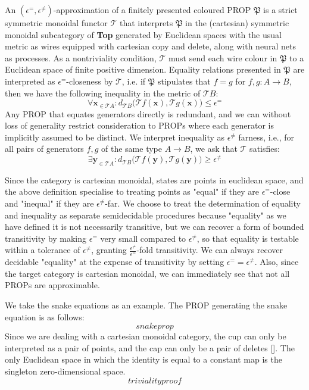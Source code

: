 \begin{fullwidth}
\begin{defn}
An $(\epsilon^{=},\epsilon^{\neq})$-approximation of a finitely presented coloured PROP $\mathfrak{P}$ is a strict symmetric monoidal functor $\mathcal{T}$ that interprets $\mathfrak{P}$ in the (cartesian) symmetric monoidal subcategory of \textbf{Top} generated by Euclidean spaces with the usual metric as wires equipped with cartesian copy and delete, along with neural nets as processes. As a nontriviality condition, $\mathcal{T}$ must send each wire colour in $\mathfrak{P}$ to a Euclidean space of finite positive dimension. Equality relations presented in $\mathfrak{P}$ are interpreted as $\epsilon^{=}$-closeness by $\mathcal{T}$, i.e. if $\mathfrak{P}$ stipulates that $f = g$ for $f,g: A \rightarrow B$, then we have the following inequality in the metric of $\mathcal{T}B$:
\[\forall \mathbf{x}_{\in\mathcal{T}A} : d_{\mathcal{T}B}\big(\mathcal{T}f(\mathbf{x}),\mathcal{T}g(\mathbf{x})\big) \leq \epsilon^{=}\]
Any PROP that equates generators directly is redundant, and we can without loss of generality restrict consideration to PROPs where each generator is implicitly assumed to be distinct. We interpret inequality as $\epsilon^{\neq}$ farness, i.e., for all pairs of generators $f,g$ of the same type $A \rightarrow B$, we ask that $\mathcal{T}$ satisfies:
\[\exists \mathbf{y}_{\in\mathcal{T}A} : d_{\mathcal{T}B}\big(\mathcal{T}f(\mathbf{y}),\mathcal{T}g(\mathbf{y})\big) \geq \epsilon^{\neq} \]
\end{defn}

Since the category is cartesian monoidal, states are points in euclidean space, and the above definition specialise to treating points as "equal" if they are $\epsilon^{=}$-close and "inequal" if they are $\epsilon^{\neq}$-far. We choose to treat the determination of equality and inequality as separate semidecidable procedures because "equality" as we have defined it is not necessarily transitive, but we can recover a form of bounded transitivity by making $\epsilon^{=}$ very small compared to $\epsilon^{\neq}$, so that equality is testable within a tolerance of $\epsilon^{\neq}$, granting $\frac{\epsilon^{\neq}}{\epsilon^{=}}$-fold transitivity. We can always recover decidable "equality" at the expense of transitivity by setting $\epsilon^{=} = \epsilon^{\neq}$. Also, since the target category is cartesian monoidal, we can immediately see that not all PROPs are approximable.

\begin{example}
We take the snake equations as an example. The PROP generating the snake equation is as follows:
\[snakeprop\]
Since we are dealing with a cartesian monoidal category, the cup can only be interpreted as a pair of points, and the cap can only be a pair of deletes []. The only Euclidean space in which the identity is equal to a constant map is the singleton zero-dimensional space.
\[triviality proof\]
\end{example}


\end{fullwidth}

